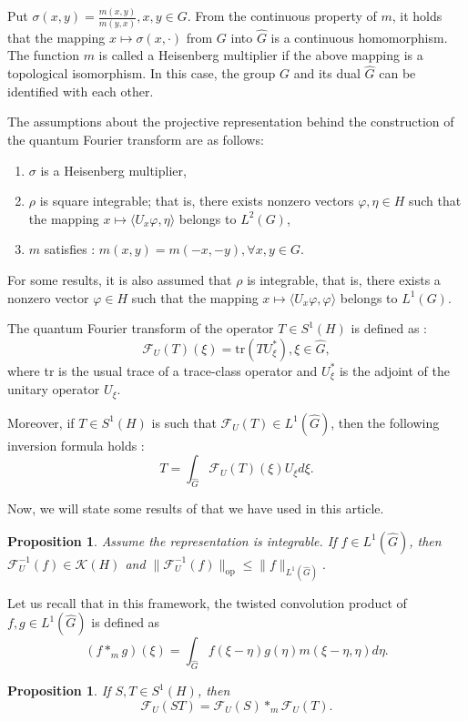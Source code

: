 \documentclass[11pt,a4paper]{amsart}
\newtheorem{proposition}[theorem]{Proposition}
\begin{document}
 Put $\sigma(x,y)=\displaystyle\frac{m(x,y)}{m(y,x)}, x,y\in G$. From the continuous property of $m$, it holds that the mapping $x\mapsto \sigma(x, \cdot)$ from $G$ into $\widehat{G}$ is a continuous homomorphism. The function $m$ is called a Heisenberg multiplier if the above mapping is a topological isomorphism. In this case, the group $G$ and its dual $\widehat{G}$ can be identified with each other. 
 
 The assumptions about the projective representation  behind the construction of the quantum Fourier transform   are as follows:
 \begin{enumerate}
 \item[i)] $\sigma$ is a Heisenberg multiplier,
 \item[ii)] $\rho$ is square integrable; that is, there exists nonzero vectors  $\varphi,\eta\in H$ such that the mapping $x\mapsto \langle U_x \varphi,\eta\rangle$ belongs to $L^2(G)$, 
 \item[iii)] $m$ satisfies : $m(x,y)=m(-x,-y), \forall x,y\in G$. 
 \end{enumerate}
  For some results, it is also assumed that $\rho$ is integrable, that is, there exists a nonzero vector $\varphi\in H$ such that  the mapping $x\mapsto \langle U_x \varphi,\varphi\rangle$ belongs to $L^1(G)$.
 

The quantum Fourier transform of the operator $T\in S^1(H)$ is defined as \cite{Fulsche} :
\begin{equation}
\mathcal{F}_U(T)(\xi)=\mbox{tr}(TU_\xi^*), \xi\in \widehat{G}, 
\end{equation}
where tr is the usual trace of a trace-class  operator and $U_\xi^*$ is the adjoint of the unitary  operator $U_\xi$. 

Moreover, if $T\in S^1(H)$ is such that $\mathcal{F}_U(T)\in L^1(\widehat{G})$, then the following inversion formula holds :
\begin{equation}
T=\int_{\widehat{G}}\mathcal{F}_U(T)(\xi)U_\xi d\xi.
\end{equation} 




Now, we will state some results of \cite{Fulsche} that we have used in this article.
\begin{proposition}\cite[Proposition 6.26]{Fulsche}\label{Fulsche Proposition 6.26}
Assume the representation
is integrable. If $f\in L^1(\widehat{G})$, then $\mathcal{F}_U^{-1}(f)\in \mathcal{K}(H)$ and $\|\mathcal{F}_U^{-1}(f)\|_{\mbox{op}}\leq \|f\|_{L^1(\widehat{G})}.$
\end{proposition}
Let us recall that in this framework, the twisted convolution product of $f,g\in L^1(\widehat{G})$ is defined as
\begin{equation}
(f\ast_m g)(\xi)=\int_{\widehat{G}}f(\xi-\eta)g(\eta)m(\xi-\eta,\eta)d\eta.
\end{equation}
\begin{proposition}\cite[Corollary 6.24]{Fulsche}\label{Fulsche Corollary 6.24}
If $S,T\in S^1(H)$, then 
$$\mathcal{F}_U(ST)=\mathcal{F}_U(S) \ast_m\mathcal{F}_U(T).$$
\end{proposition}
\end{document}
